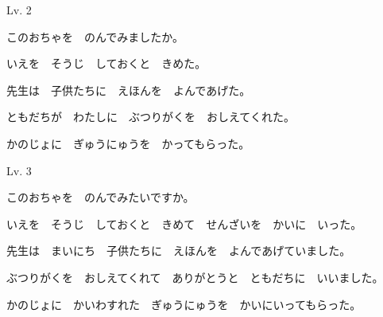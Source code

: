 	\begin{mondai}{Lv. 2}
		\item このおちゃを　のんでみましたか。
		\item いえを　そうじ　しておくと　きめた。
		\item 先生は　子供たちに　えほんを　よんであげた。
		\item ともだちが　わたしに　ぶつりがくを　おしえてくれた。
		\item かのじょに　ぎゅうにゅうを　かってもらった。
	\end{mondai}

	\begin{mondai}{Lv. 3}
		\item このおちゃを　のんでみたいですか。
		\item いえを　そうじ　しておくと　きめて　せんざいを　かいに　いった。
		\item 先生は　まいにち　子供たちに　えほんを　よんであげていました。
		\item ぶつりがくを　おしえてくれて　ありがとうと　ともだちに　いいました。
		\item *かのじょに　かいわすれた　ぎゅうにゅうを　かいにいってもらった。
	\end{mondai}

